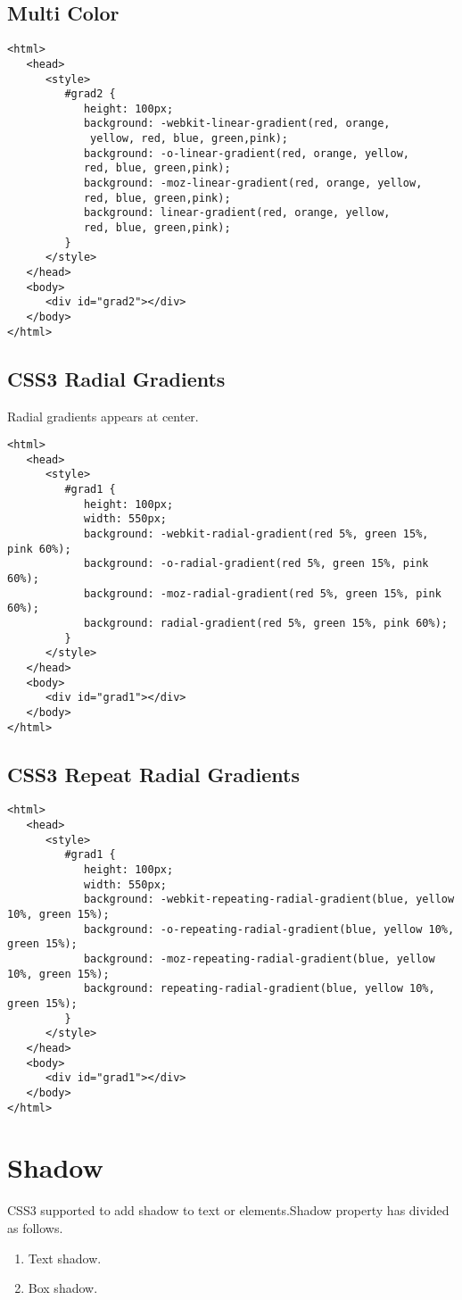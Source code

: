 \documentclass[a4paper,oneside]{book}
\numberwithin{equation}{chapter}
\begin{document}
\subsection{Multi Color}
\begin{verbatim}
<html>
   <head>
      <style>
         #grad2 {
            height: 100px;
            background: -webkit-linear-gradient(red, orange,
             yellow, red, blue, green,pink); 
            background: -o-linear-gradient(red, orange, yellow, 
            red, blue, green,pink); 
            background: -moz-linear-gradient(red, orange, yellow, 
            red, blue, green,pink); 
            background: linear-gradient(red, orange, yellow, 
            red, blue, green,pink); 
         }
      </style>
   </head>
   <body>
      <div id="grad2"></div>
   </body>
</html> 
\end{verbatim}
\subsection{CSS3 Radial Gradients}
Radial gradients appears at center.
\begin{verbatim}
<html>
   <head>
      <style>
         #grad1 {
            height: 100px;
            width: 550px;
            background: -webkit-radial-gradient(red 5%, green 15%, pink 60%); 
            background: -o-radial-gradient(red 5%, green 15%, pink 60%); 
            background: -moz-radial-gradient(red 5%, green 15%, pink 60%); 
            background: radial-gradient(red 5%, green 15%, pink 60%); 
         }
      </style>
   </head>
   <body>
      <div id="grad1"></div>
   </body>
</html> 
\end{verbatim}
\subsection{CSS3 Repeat Radial Gradients}
\begin{verbatim}
<html>
   <head>
      <style>
         #grad1 {
            height: 100px;
            width: 550px;
            background: -webkit-repeating-radial-gradient(blue, yellow 10%, green 15%); 
            background: -o-repeating-radial-gradient(blue, yellow 10%, green 15%);
            background: -moz-repeating-radial-gradient(blue, yellow 10%, green 15%);
            background: repeating-radial-gradient(blue, yellow 10%, green 15%); 
         }
      </style>
   </head>
   <body>
      <div id="grad1"></div>
   </body>
</html> 
\end{verbatim}
\section{Shadow}
CSS3 supported to add shadow to text or elements.Shadow property has divided as follows.
\begin{enumerate}
\item Text shadow.
\item Box shadow.
\end{enumerate}
\end{document}
